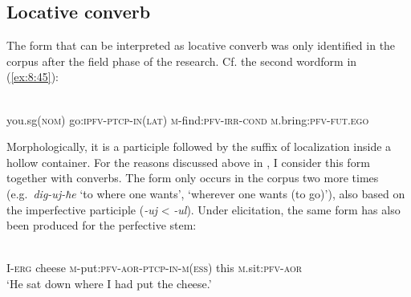 ﻿\documentclass[output=paper]{langsci/langscibook}
\begin{document}
\subsection{Locative converb}

The form that can be interpreted as locative converb was only identified in the corpus after the
field phase of the research. Cf. the second wordform in (\ref{ex:8:45}):

\ea \label{ex:8:45} %
\\
you.sg(\textsc{nom}) go:\textsc{ipfv}-\textsc{ptcp}-\textsc{in}(\textsc{lat}) \textsc{m}-find:\textsc{pfv}-\textsc{irr}-\textsc{cond} \textsc{m}.bring:\textsc{pfv}-\textsc{fut}.\textsc{ego}\\
\z

Morphologically, it is a participle followed by the suffix of localization inside a hollow container. 
For the reasons discussed above in , I consider this form together with converbs. 
The form only occurs in the corpus two more times (e.g.\ \emph{dig-uj-ħe} `to
where one wants', `wherever one wants (to go)'), also based on the
imperfective participle (\emph{-uj} \textless{} \mbox{\emph{-ul}}). Under
elicitation, the same form has also been produced for the perfective
stem:

\ea \label{ex:8:46} %
\\
I-\textsc{erg} cheese \textsc{m}-put:\textsc{pfv}-\textsc{aor}-\textsc{ptcp}-\textsc{in}-\textsc{m}(\textsc{ess}) this \textsc{m}.sit:\textsc{pfv}-\textsc{aor}\\
\glt `He sat down where I had put the cheese.'
\z

\removelastskip
\largerpage
\end{document}
